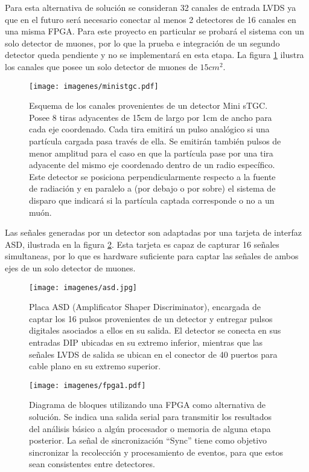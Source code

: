 Para esta alternativa de solución se consideran 32 canales de entrada LVDS ya que en el futuro será necesario conectar al menos 2 detectores de 16 canales en una misma FPGA. Para este proyecto en particular se probará el sistema con un solo detector de muones, por lo que la prueba e integración de un segundo detector queda pendiente y no se implementará en esta etapa. La figura \ref{fig:ministgc} ilustra los canales que posee un solo detector de muones de $15cm^2$.

\begin{figure}[H]
	\centering
	\texttt{[image: imagenes/ministgc.pdf]}
	\caption{Esquema de los canales provenientes de un detector Mini sTGC. Posee 8 tiras adyacentes de 15cm de largo por 1cm de ancho para cada eje coordenado. Cada tira emitirá un pulso analógico si una partícula cargada pasa través de ella. Se emitirán también pulsos de menor amplitud para el caso en que la partícula pase por una tira adyacente del mismo eje coordenado dentro de un radio específico. Este detector se posiciona perpendicularmente respecto a la fuente de radiación y en paralelo a (por debajo o por sobre) el sistema de disparo que indicará si la partícula captada corresponde o no a un muón. }
	\label{fig:ministgc}
\end{figure}

Las señales generadas por un detector son adaptadas por una tarjeta de interfaz ASD\cite{1999ATLASICs}, ilustrada en la figura \ref{fig:asd}. Esta tarjeta es capaz de capturar 16 señales simultaneas, por lo que es hardware suficiente para captar las señales de ambos ejes de un solo detector de muones.

\begin{figure}[H]
	\centering
	\texttt{[image: imagenes/asd.jpg]}
	\caption{Placa ASD\cite{1999ATLASICs} (Amplificator Shaper Discriminator), encargada de captar los 16 pulsos provenientes de un detector y entregar pulsos digitales asociados a ellos en su salida. El detector se conecta en sus entradas DIP ubicadas en su extremo inferior, mientras que las señales LVDS de salida se ubican en el conector de 40 puertos para cable plano en su extremo superior.}
	\label{fig:asd}
\end{figure}

\begin{figure}[H]
	\centering
	\texttt{[image: imagenes/fpga1.pdf]}
	\caption{Diagrama de bloques utilizando una FPGA como alternativa de solución. Se indica una salida serial para transmitir los resultados del análisis básico a algún procesador o memoria de alguna etapa posterior. La señal de sincronización ``Sync'' tiene como objetivo sincronizar la recolección y procesamiento de eventos, para que estos sean consistentes entre detectores.}
	\label{fig:fpga1}
\end{figure}


